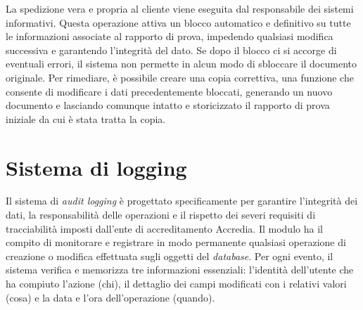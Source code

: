 La spedizione vera e propria al cliente viene eseguita dal
responsabile dei sistemi informativi. Questa operazione attiva un blocco
automatico e definitivo su tutte le informazioni associate al rapporto di
prova, impedendo qualsiasi modifica successiva e garantendo l'integrità del
dato. Se dopo il blocco ci si accorge di eventuali errori, il sistema non
permette in alcun modo di sbloccare il documento originale. Per rimediare, è
possibile creare una copia correttiva, una funzione che consente di
modificare i dati precedentemente bloccati, generando un nuovo documento e
lasciando comunque intatto e storicizzato il rapporto di prova iniziale da cui
è stata tratta la copia.
\section{Sistema di logging}
Il sistema di \textit{audit logging} è progettato specificamente per
garantire l'integrità dei dati, la responsabilità delle operazioni e il
rispetto dei severi requisiti di tracciabilità imposti dall'ente di
accreditamento Accredia. Il modulo ha il compito di monitorare e registrare in
modo permanente qualsiasi operazione di creazione o modifica effettuata sugli
oggetti del \textit{database}. Per ogni evento, il sistema verifica e memorizza tre
informazioni essenziali: l'identità dell'utente che ha compiuto l'azione (chi),
il dettaglio dei campi modificati con i relativi valori (cosa) e la data e
l'ora dell'operazione (quando).

